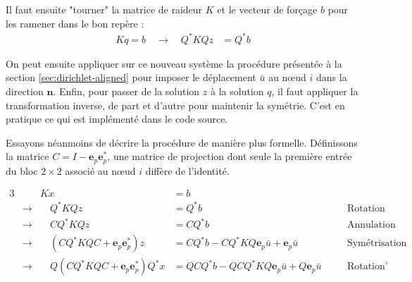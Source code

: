 \documentclass[12pt]{article}
\begin{document}
Il faut ensuite "tourner" la matrice de raideur $K$ et le vecteur de forçage $b$
pour les ramener dans le bon repère :
\begin{align}
    K q = b \quad\longrightarrow\quad Q^* K Q z &= Q^* b
\end{align}

On peut ensuite appliquer sur ce nouveau système la procédure présentée à la
section \ref{sec:dirichlet-aligned} pour imposer le déplacement $\bar u$ au
n\oe ud $i$ dans la direction $\mathbf{n}$. Enfin, pour passer de la solution
$z$ à la solution $q$, il faut appliquer la transformation inverse, de part
et d'autre pour maintenir la symétrie. C'est en pratique ce qui est implémenté
dans le code source.

Essayons néanmoins de décrire la procédure de manière plus formelle.
Définissons la matrice $C = I - \mathbf{e}_p \mathbf{e}_p^*$, une 
matrice de projection dont seule la première entrée du bloc $2\times 2$ 
associé au n\oe ud $i$ diffère de l'identité.

\begin{alignat}{3}
    && K x &= b\\
    &\longrightarrow &\quad Q^* K Q z &= Q^* b  &\quad&\text{Rotation}\\
    &\longrightarrow &\quad C Q^* K Q z &= C Q^* b &\quad&\text{Annulation}\\
    &\longrightarrow &\quad (C Q^* K Q C + \mathbf{e}_p \mathbf{e}_p^*) z 
        &= C Q^* b - C Q^*KQ \mathbf{e}_p \bar u + \mathbf{e}_p \bar u
        &\quad&\text{Symétrisation}\\
    &\longrightarrow &\quad Q(C Q^* K Q C + \mathbf{e}_p \mathbf{e}_p^*) Q^*x 
        &= Q C Q^* b - Q C Q^*KQ \mathbf{e}_p \bar u + Q \mathbf{e}_p \bar u
        &\quad&\text{Rotation'}
\end{alignat}
\end{document}
